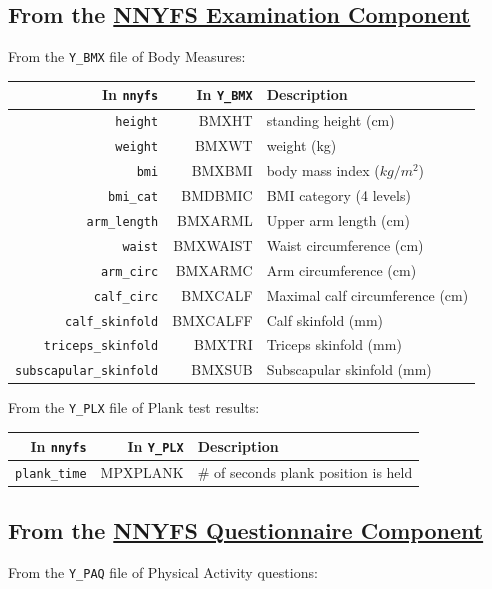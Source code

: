 \documentclass[
]{book}
\begin{document}
\hypertarget{from-the-nnyfs-examination-component}{%
\subsection{\texorpdfstring{From the \href{https://wwwn.cdc.gov/nchs/nhanes/search/nnyfsdata.aspx?Component=Examination}{NNYFS Examination Component}}{From the NNYFS Examination Component}}\label{from-the-nnyfs-examination-component}}

From the \texttt{Y\_BMX} file of Body Measures:

\begin{longtable}[]{@{}rrl@{}}
\toprule
In \texttt{nnyfs} & In \texttt{Y\_BMX} & Description\tabularnewline
\midrule
\endhead
\texttt{height} & BMXHT & standing height (cm)\tabularnewline
\texttt{weight} & BMXWT & weight (kg)\tabularnewline
\texttt{bmi} & BMXBMI & body mass index (\(kg/m^2\))\tabularnewline
\texttt{bmi\_cat} & BMDBMIC & BMI category (4 levels)\tabularnewline
\texttt{arm\_length} & BMXARML & Upper arm length (cm)\tabularnewline
\texttt{waist} & BMXWAIST & Waist circumference (cm)\tabularnewline
\texttt{arm\_circ} & BMXARMC & Arm circumference (cm)\tabularnewline
\texttt{calf\_circ} & BMXCALF & Maximal calf circumference (cm)\tabularnewline
\texttt{calf\_skinfold} & BMXCALFF & Calf skinfold (mm)\tabularnewline
\texttt{triceps\_skinfold} & BMXTRI & Triceps skinfold (mm)\tabularnewline
\texttt{subscapular\_skinfold} & BMXSUB & Subscapular skinfold (mm)\tabularnewline
\bottomrule
\end{longtable}

From the \texttt{Y\_PLX} file of Plank test results:

\begin{longtable}[]{@{}rrl@{}}
\toprule
In \texttt{nnyfs} & In \texttt{Y\_PLX} & Description\tabularnewline
\midrule
\endhead
\texttt{plank\_time} & MPXPLANK & \# of seconds plank position is held\tabularnewline
\bottomrule
\end{longtable}

\hypertarget{from-the-nnyfs-questionnaire-component}{%
\subsection{\texorpdfstring{From the \href{https://wwwn.cdc.gov/nchs/nhanes/search/nnyfsdata.aspx?Component=Questionnaire}{NNYFS Questionnaire Component}}{From the NNYFS Questionnaire Component}}\label{from-the-nnyfs-questionnaire-component}}

From the \texttt{Y\_PAQ} file of Physical Activity questions:
\end{document}
